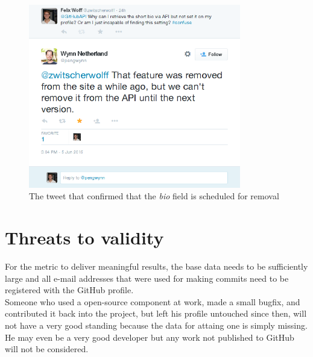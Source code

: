 \begin{figure}
  \centering
  \includegraphics[width=25em]{gfx/githubapi_tweet.png}
  \caption{The tweet that confirmed that the \textit{bio} field is scheduled for removal}
  \label{fig:gapitweet}
\end{figure}

\section{Threats to validity}\label{sec:threatstovalidity}
For the metric to deliver meaningful results, the base data
needs to be sufficiently large and all e-mail addresses that were used for
making commits need to be registered with the GitHub profile.\\

Someone who used a open-source component at work, made a small bugfix,
and contributed it back into the project, but left his profile untouched
since then, will not have a very good standing because the data
for attaing one is simply missing. He may even be a very good developer
but any work not published to GitHub will not be considered.
